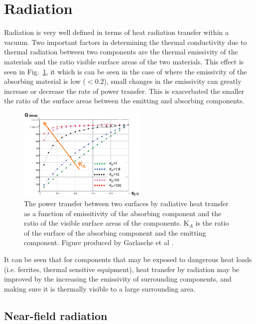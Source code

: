 \section{Radiation}

Radiation is very well defined in terms of heat radiation transfer within a vacuum. Two important factors in determining the thermal conductivity due to thermal radiation between two components are the thermal emissivity of the materials and the ratio visible surface areas of the two materials. This effect is seen in Fig.~\ref{fig:powTransRadSurfEmis}, it which is can be seen in the case of where the emissivity of the absorbing material is low ($< 0.2$), small changes in the emissivity can greatly increase or decrease the rate of power transfer. This is exacerbated the smaller the ratio of the surface areas between the emitting and absorbing components.

\begin{figure}
\begin{center}
\includegraphics[width=0.55\textwidth]{appendices/figures/powTransRadSurEmis.png}
\end{center}
\caption{The power transfer between two surfaces by radiative heat transfer as a function of emissitivity of the absorbing component and the ratio of the visible surface areas of the components. K$_{A}$ is the ratio of the surface of the absorbing component and the emitting component. Figure produced by Garlasche et al \cite{Garlasche:heatTransfer}.}
\label{fig:powTransRadSurfEmis}
\end{figure}

It can be seen that for components that may be exposed to dangerous heat loads (i.e. ferrites, thermal sensitive equipment), heat transfer by radiation may be improved by the increasing the emissivity of surrounding components, and making sure it is thermally visible to a large surrounding area.

\subsection{Near-field radiation}

